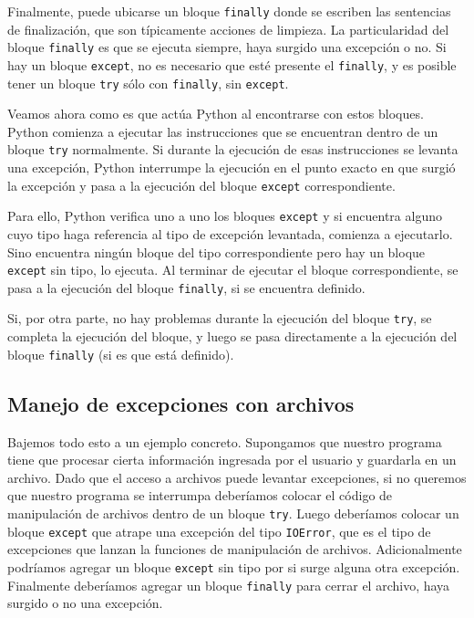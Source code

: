 Finalmente, puede ubicarse un bloque \lstinline!finally! donde se escriben
las sentencias de finalización, que son típicamente acciones de limpieza.
La particularidad del bloque \lstinline!finally! es que se ejecuta siempre,
haya surgido una excepción o no. Si hay un bloque \lstinline!except!, no es
necesario que esté presente el \lstinline!finally!, y es posible tener un
bloque \lstinline!try! sólo con \lstinline!finally!, sin
\lstinline!except!.

Veamos ahora como es que actúa Python al encontrarse con estos bloques. Python
comienza a ejecutar las instrucciones que se encuentran dentro de un bloque
\lstinline!try! normalmente. Si durante la ejecución de esas instrucciones
se levanta una excepción, Python interrumpe la ejecución en el
punto exacto en que surgió la excepción y pasa a la ejecución del bloque
\lstinline!except! correspondiente.

Para ello, Python verifica uno a uno los bloques \lstinline!except! y si
encuentra alguno cuyo tipo haga referencia al tipo de excepción levantada,
comienza a ejecutarlo. Sino encuentra ningún bloque del tipo
correspondiente pero hay un bloque \lstinline!except! sin tipo, lo
ejecuta. Al terminar de ejecutar el bloque correspondiente, se pasa a la
ejecución del bloque \lstinline!finally!, si se encuentra definido.

Si, por otra parte, no hay problemas durante la ejecución del bloque
\lstinline!try!, se completa la ejecución del bloque, y luego se pasa
directamente a la ejecución del bloque \lstinline!finally! (si es que está
definido).

\subsection{Manejo de excepciones con archivos}

Bajemos todo esto a un ejemplo concreto. Supongamos que nuestro programa
tiene que procesar cierta información ingresada por el usuario y guardarla
en un archivo. Dado que el acceso a archivos puede levantar
excepciones, si no queremos que nuestro programa se interrumpa
deberíamos colocar el código de manipulación de
archivos dentro de un bloque \lstinline!try!. Luego deberíamos
colocar un bloque \lstinline!except! que atrape una excepción del tipo
\lstinline!IOError!, que es el tipo de excepciones que lanzan la funciones
de manipulación de archivos. Adicionalmente podríamos agregar un bloque
\lstinline!except! sin tipo por si surge alguna otra excepción.  Finalmente
deberíamos agregar un bloque \lstinline!finally! para cerrar el archivo,
haya surgido o no una excepción.

